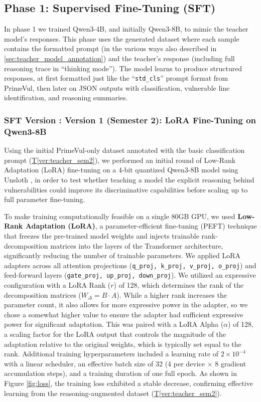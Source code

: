\documentclass[12pt,a4paper]{article}
\makeatletter
\newcounter{SFTVer}
\newcommand{\sftversion}[2]{%
  \stepcounter{SFTVer}%
  \subsubsection{SFT Version \theSFTVer: #1}%
  \protected@edef\@currentlabel{\theSFTVer}\label{#2}%
}
\makeatother
\begin{document}
\subsection{Phase 1: Supervised Fine-Tuning (SFT)}
In phase 1 we trained Qwen3-4B, and initially Qwen3-8B, to mimic the teacher model's responses. This phase uses the generated dataset where each sample contains the formatted prompt (in the various ways also described in \ref{sec:teacher_model_annotation}) and the teacher's response (including full reasoning trace in ``thinking mode''). The model learns to produce structured responses, at first formatted just like the ``\texttt{std\_cls}'' prompt format from PrimeVul\cite{primevul}, then later on JSON outputs with classification, vulnerable line identification, and reasoning summaries.

\sftversion{Version 1 (Semester 2): LoRA Fine-Tuning on Qwen3-8B}{ver:sft_lora}
Using the initial PrimeVul-only dataset annotated with the basic classification prompt (\hyperref[ver:teacher_sem2]{T\ref*{ver:teacher_sem2}}), we performed an initial round of Low-Rank Adaptation (LoRA) fine-tuning on a 4-bit quantized Qwen3-8B model using Unsloth \cite{unsloth}, in order to test whether teaching a model the explicit reasoning behind vulnerabilities could improve its discriminative capabilities before scaling up to full parameter fine-tuning.

To make training computationally feasible on a single 80GB GPU, we used \textbf{Low-Rank Adaptation (LoRA)}, a parameter-efficient fine-tuning (PEFT) technique that freezes the pre-trained model weights and injects trainable rank-decomposition matrices into the layers of the Transformer architecture, significantly reducing the number of trainable parameters. We applied LoRA adapters across all attention projections (\texttt{q\_proj, k\_proj, v\_proj, o\_proj}) and feed-forward layers (\texttt{gate\_proj, up\_proj, down\_proj}). We utilized an expressive configuration with a LoRA Rank ($r$) of 128, which determines the rank of the decomposition matrices ($W_{\Delta} = B \cdot A$). While a higher rank increases the parameter count, it also allows for more expressive power in the adapter, so we chose a somewhat higher value to ensure the adapter had sufficient expressive power for significant adaptation. This was paired with a LoRA Alpha ($\alpha$) of 128, a scaling factor for the LoRA output that controls the magnitude of the adaptation relative to the original weights, which is typically set equal to the rank. Additional training hyperparameters included a learning rate of $2 \times 10^{-4}$ with a linear scheduler, an effective batch size of 32 (4 per device $\times$ 8 gradient accumulation steps), and a training duration of one full epoch. As shown in Figure \ref{fig:loss}, the training loss exhibited a stable decrease, confirming effective learning from the reasoning-augmented dataset (\hyperref[ver:teacher_sem2]{T\ref*{ver:teacher_sem2}}).
\end{document}
